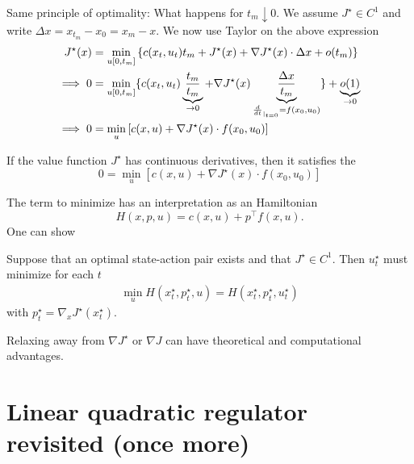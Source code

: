 Same principle of optimality: What happens for \(t_m\downarrow 0\). We assume 
\(J^\star\in C^1\)
and write \(\Delta x=x_{t_m}-x_0=x_m-x\). We now use Taylor on the above expression 
\begin{align*}
    J^\star(x)&= \min_{u[0,t_m]}\left\{c(x_t,u_t)t_m+J^\star(x)+\nabla J^\star(x)\cdot \Delta x + o(t_m)  \right\}\\
    \implies 0&=\min_{u[0,t_m]}\{c(x_t,u_t)\underbrace{\frac{t_m}{t_m}}_{\to 0}+\nabla J^\star(x)\underbrace{\frac{\Delta x}{t_m}}_{\frac{d}{dt}_{|_{t=0}}=f(x_0,u_0)}\} + \underbrace{o(1)}_{\to 0} \\
    \implies 0&=\min_{u}\left[c(x,u)+\nabla J^\star(x)\cdot f(x_0,u_0)\right]
\end{align*}

\begin{theorem}\label{thm:1.23}
    If the value function \(J^\star\) has continuous derivatives, then it 
    satisfies the 
    \begin{equation}\label{eq:hamilton_jacobi_bellmann}
        0=\min_{u}\left[c(x,u)+\nabla J^\star(x)\cdot f(x_0,u_0)\right]
    \end{equation}
\end{theorem}

The term to minimize  has an interpretation 
as an Hamiltonian 
\[H(x,p,u)=c(x,u)+p^\intercal f(x,u).\]
One can show 
\begin{theorem}\label{thm:1.24}
    Suppose that an optimal state-action pair exists 
    and that \(J^\star\in C^1\). Then \(u_t^\star\) must minimize
    for each \(t\) 
    \begin{align*}
        \min_u H(x_t^\star,p_t^\star,u)=H(x_t^\star,p_t^\star,u_t^\star)
    \end{align*}
    with \(p_t^\star=\nabla_x J^\star(x_t^\star)\).
\end{theorem}
\begin{remark}
    Relaxing away from \(\nabla J^\star\) or \(\nabla J\) can have 
    theoretical and computational advantages.
\end{remark}

\section{Linear quadratic regulator revisited (once more)}


